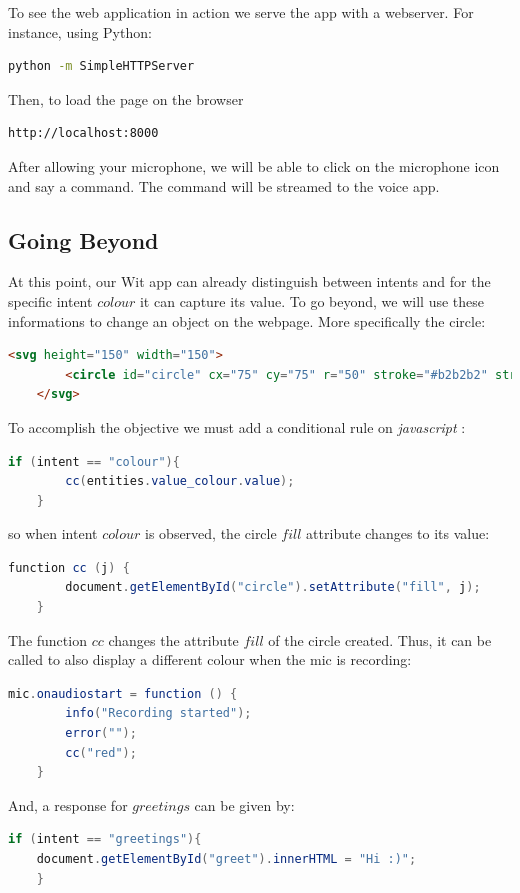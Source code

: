 \documentclass[twoside,11pt]{article}
\begin{document}
To see the web application in action we serve the app with a webserver.
For instance, using Python:
\begin{lstlisting}[language=bash]
	python -m SimpleHTTPServer
\end{lstlisting}
Then, to load the page on the browser
\begin{lstlisting}[language=bash]
	http://localhost:8000
\end{lstlisting}



After allowing your microphone, we will be able to click on the microphone icon and say a command. 
The command will be streamed to the voice app.

\subsection{Going Beyond}

At this point, our Wit app can already distinguish between intents and for the specific intent $colour$ it can capture its value.
To go beyond, we will use these informations to change an object on the webpage.
More specifically the circle:
\begin{lstlisting}[language=html]
	<svg height="150" width="150">
		<circle id="circle" cx="75" cy="75" r="50" stroke="#b2b2b2" stroke-width="4"/>
	</svg> 
\end{lstlisting}

To accomplish the objective we must add a conditional rule on \emph{javascript} \citep{flanagan2006javascript}: 
\begin{lstlisting}[language=java]
	if (intent == "colour"){
		cc(entities.value_colour.value);
 	}
\end{lstlisting}
so when intent $colour$ is observed, the circle $fill$ attribute changes to its value:
\begin{lstlisting}[language=java]
	function cc (j) {
		document.getElementById("circle").setAttribute("fill", j);
	}
\end{lstlisting}

The function $cc$ changes the attribute $fill$ of the circle created.
Thus, it can be called to also display a different colour when the mic is recording:
\begin{lstlisting}[language=java]
	mic.onaudiostart = function () {
		info("Recording started");
        error("");
        cc("red");
	}
\end{lstlisting}

And, a response for $greetings$ can be given by:
\begin{lstlisting}[language=java]
	if (intent == "greetings"){
	document.getElementById("greet").innerHTML = "Hi :)";
	}
\end{lstlisting}
\end{document}
